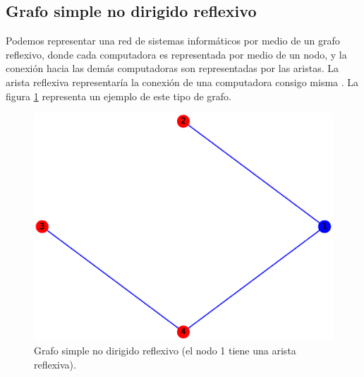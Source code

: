 \documentclass{article}
\begin{document}
\subsection{Grafo simple no dirigido reflexivo}
Podemos representar una red de sistemas informáticos por medio de un grafo reflexivo, donde cada computadora es representada por medio de un nodo, y la conexión hacia las demás computadoras son representadas por las aristas. La arista reflexiva representaría la conexión de una computadora consigo misma \cite{GSNDR}. La figura \ref{fig:GSNDR} representa un ejemplo de este tipo de grafo.
\begin{figure}[H]
    \includegraphics[width=\textwidth]{3-GSNDC}
    \caption{Grafo simple no dirigido reflexivo (el nodo 1 tiene una arista reflexiva).}
    \label{fig:GSNDR}
\end{figure}
\end{document}
